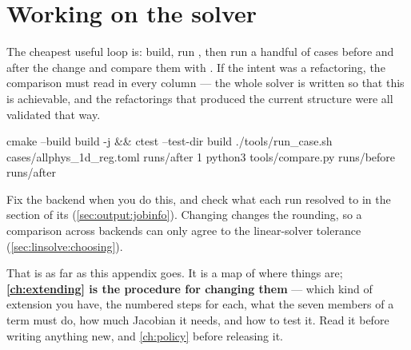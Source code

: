 \section{Working on the solver}
\label{sec:layout:workflow}

The cheapest useful loop is: build, run , then run a handful of
cases before and after the change and compare them with
. If the intent was a refactoring, the comparison must
read  in every column --- the whole solver is written so that
this is achievable, and the refactorings that produced the current structure
were all validated that way.

\begin{shell}
cmake --build build -j && ctest --test-dir build
./tools/run_case.sh cases/allphys_1d_reg.toml runs/after 1
python3 tools/compare.py runs/before runs/after
\end{shell}

Fix the backend when you do this, and check what each run resolved to in the
 section of its 
(\cref{sec:output:jobinfo}). Changing  changes the rounding, so a
comparison across backends can only agree to the linear-solver tolerance
(\cref{sec:linsolve:choosing}).

That is as far as this appendix goes. It is a map of where things are;
\textbf{\cref{ch:extending} is the procedure for changing them} --- which kind
of extension you have, the numbered steps for each, what the seven members of
a term must do, how much Jacobian it needs, and how to test it. Read it before
writing anything new, and \cref{ch:policy} before releasing it.
